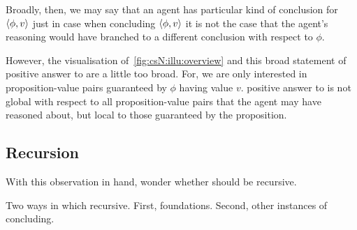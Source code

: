 \begin{note}
  Broadly, then, we may say that an agent has {\color{red} particular kind of conclusion} for \(\langle \phi, v \rangle\) just in case when concluding \(\langle \phi, v \rangle\) it is not the case that the agent's reasoning would have branched to a different conclusion with respect to \(\phi\).

  However, the visualisation of~\autoref{fig:csN:illu:overview} and this broad statement of {\color{red} positive answer to \qzS{}} are a little too broad.
  For, we are only interested in proposition-value pairs guaranteed by \(\phi\) having value \(v\).
  {\color{red} positive answer to \qzS{}} is not global with respect to all proposition-value pairs that the agent may have reasoned about, but local to those guaranteed by the proposition.
\end{note}

\subsection{Recursion}
\label{cha:zS:sec:question:recursion}

\begin{note}
  With this observation in hand, wonder whether \qzS{} should be recursive.

  Two ways in which recursive.
  First, foundations.
  Second, other instances of concluding.
\end{note}

